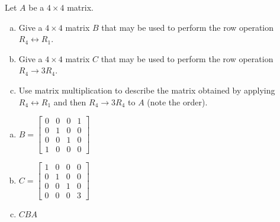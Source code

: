 
\begin{exerciseStatement}


Let \(A\) be a \(4 \times 4\) matrix.


\begin{enumerate}[(a)]
\item Give a \(4 \times 4\) matrix \(B\) that may be used to perform the row operation \( R_4 \leftrightarrow R_1 \).
\item Give a \(4 \times 4\) matrix \(C\) that may be used to perform the row operation \( R_4 \to 3R_4 \).
\item Use matrix multiplication to describe the matrix obtained by applying \( R_4 \leftrightarrow R_1 \) and then \( R_4 \to 3R_4 \) to \(A\) (note the order). 
\end{enumerate}
    
\end{exerciseStatement}
    
\begin{exerciseAnswer} 

\begin{enumerate}[(a)]
\item \(B= \left[\begin{array}{cccc}
0 & 0 & 0 & 1 \\
0 & 1 & 0 & 0 \\
0 & 0 & 1 & 0 \\
1 & 0 & 0 & 0
\end{array}\right] \)
\item \(C= \left[\begin{array}{cccc}
1 & 0 & 0 & 0 \\
0 & 1 & 0 & 0 \\
0 & 0 & 1 & 0 \\
0 & 0 & 0 & 3
\end{array}\right] \)
\item \(CBA\)
\end{enumerate}
    
\end{exerciseAnswer}
    
